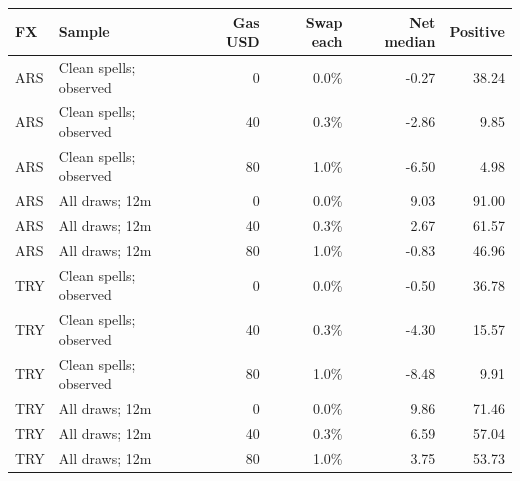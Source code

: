 \begin{tabular}{llrrrr}
\toprule
FX & Sample & Gas USD & Swap each & Net median & Positive \\
\midrule
ARS & Clean spells; observed & 0 & 0.0\% & -0.27 & 38.24 \\
ARS & Clean spells; observed & 40 & 0.3\% & -2.86 & 9.85 \\
ARS & Clean spells; observed & 80 & 1.0\% & -6.50 & 4.98 \\
ARS & All draws; 12m & 0 & 0.0\% & 9.03 & 91.00 \\
ARS & All draws; 12m & 40 & 0.3\% & 2.67 & 61.57 \\
ARS & All draws; 12m & 80 & 1.0\% & -0.83 & 46.96 \\
TRY & Clean spells; observed & 0 & 0.0\% & -0.50 & 36.78 \\
TRY & Clean spells; observed & 40 & 0.3\% & -4.30 & 15.57 \\
TRY & Clean spells; observed & 80 & 1.0\% & -8.48 & 9.91 \\
TRY & All draws; 12m & 0 & 0.0\% & 9.86 & 71.46 \\
TRY & All draws; 12m & 40 & 0.3\% & 6.59 & 57.04 \\
TRY & All draws; 12m & 80 & 1.0\% & 3.75 & 53.73 \\
\bottomrule
\end{tabular}
